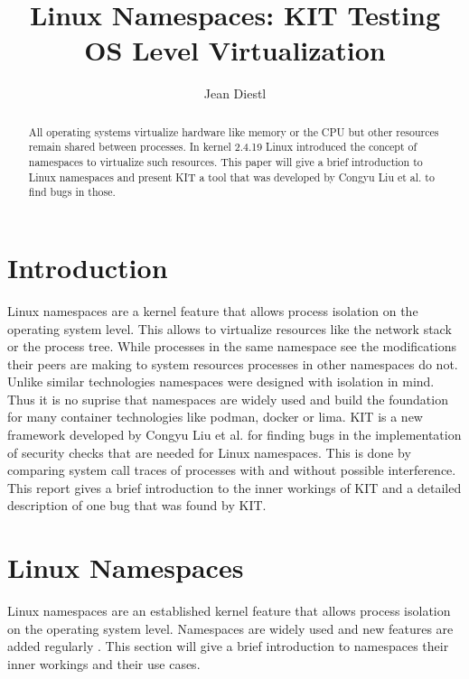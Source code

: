 \documentclass[10pt,twocolumn,a4paper]{article}
\author{Jean Diestl}
\begin{document}
\title{Linux Namespaces: KIT Testing OS Level Virtualization}

\newcommand{\todo}[1]{{\texttt{[#1]}}}
\newcommand{\code}[1]{{\tt \small{#1}}}

\maketitle

\lstset{language=C, basicstyle=\ttfamily,
        columns=fullflexible,
        string=[b]', showspaces=false, showtabs=false,
         captionpos=b,
        framerule=1pt,
        breaklines=true, breakatwhitespace=true,
        autogobble=true}

\begin{abstract}
All operating systems virtualize hardware like memory or the CPU but other resources remain shared between processes.
In kernel 2.4.19 Linux introduced the concept of namespaces to virtualize such resources. This paper will give a brief 
introduction to Linux namespaces and present KIT a tool that was developed by Congyu Liu et al. to
find bugs in those.
\end{abstract}

\section{Introduction}\label{sec:introduction}
Linux namespaces are a kernel feature that allows process isolation on the operating system level.
This allows to virtualize resources like the network stack or the process tree.
While processes in the same namespace see the modifications their peers are making to system resources
processes in other namespaces do not. Unlike similar technologies namespaces were designed with
isolation in mind\cite{31}. Thus it is no suprise that namespaces are widely used and build the foundation
for many container technologies like podman, docker or lima\cite{33}.
KIT is a new framework developed by Congyu Liu et al. for finding bugs in the implementation of
security checks that are needed for Linux namespaces\cite{0}. 
This is done by comparing system call traces of processes with and without possible interference.
This report gives a brief introduction to the inner
workings of KIT and a detailed description of one bug
that was found by KIT. 

\section{Linux Namespaces}
Linux namespaces are an established kernel feature that allows process isolation on the operating system level.
Namespaces are widely used and new features are added regularly \cite{31}.
This section will give a brief introduction to namespaces their inner workings and their use cases.
\end{document}
